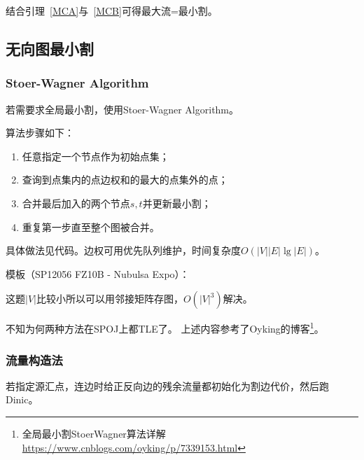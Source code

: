结合引理~\ref{MCA}与~\ref{MCB}可得最大流=最小割。
\subsection{无向图最小割}
\subsubsection{Stoer-Wagner Algorithm}
若需要求全局最小割，使用Stoer-Wagner Algorithm。

算法步骤如下：
\begin{enumerate}
	\item 任意指定一个节点作为初始点集；
	\item 查询到点集内的点边权和的最大的点集外的点；
	\item 合并最后加入的两个节点$s,t$并更新最小割；
	\item 重复第一步直至整个图被合并。
\end{enumerate}
具体做法见代码。边权可用优先队列维护，时间复杂度$O(|V||E|\lg |E|)$。

模板（SP12056 FZ10B - Nubulsa Expo）：


这题$|V|$比较小所以可以用邻接矩阵存图，$O(|V|^3)$解决。


不知为何两种方法在SPOJ上都TLE了。
上述内容参考了Oyking的博客\footnote{
	全局最小割StoerWagner算法详解
	\url{https://www.cnblogs.com/oyking/p/7339153.html}
}。
\subsubsection{流量构造法}
若指定源汇点，连边时给正反向边的残余流量都初始化为割边代价，然后跑Dinic。
